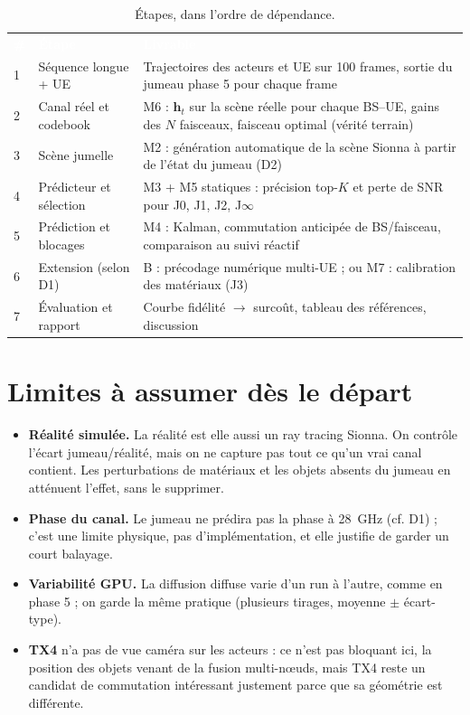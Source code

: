 \documentclass[11pt,a4paper]{article}
\newcommand{\hd}[1]{\textcolor{white}{\textbf{#1}}}
\begin{document}
\begin{table}[H]
\centering
\caption{Étapes, dans l'ordre de dépendance.}
\label{tab:plan}
\begin{tabularx}{\linewidth}{B{0.6cm} P{4.2cm} L}
\hd{\#} & \hd{Étape} & \hd{Livrable} \\
1 & Séquence longue + UE & Trajectoires des acteurs et UE sur 100 frames, sortie du jumeau phase 5 pour chaque frame \\
2 & Canal réel et codebook & M6 : $\mathbf{h}_t$ sur la scène réelle pour chaque BS--UE, gains des $N$ faisceaux, faisceau optimal (vérité terrain) \\
3 & Scène jumelle & M2 : génération automatique de la scène Sionna à partir de l'état du jumeau (D2) \\
4 & Prédicteur et sélection & M3 + M5 statiques : précision top-$K$ et perte de SNR pour J0, J1, J2, J$\infty$ \\
5 & Prédiction et blocages & M4 : Kalman, commutation anticipée de BS/faisceau, comparaison au suivi réactif \\
6 & Extension (selon D1) & B : précodage numérique multi-UE ; ou M7 : calibration des matériaux (J3) \\
7 & Évaluation et rapport & Courbe fidélité $\to$ surcoût, tableau des références, discussion \\
\end{tabularx}
\end{table}

\section{Limites à assumer dès le départ}
\begin{itemize}
  \item \textbf{Réalité simulée.} La \og réalité \fg{} est elle aussi un ray tracing Sionna. On
        contrôle l'écart jumeau/réalité, mais on ne capture pas tout ce qu'un vrai canal
        contient. Les perturbations de matériaux et les objets absents du jumeau en atténuent
        l'effet, sans le supprimer.
  \item \textbf{Phase du canal.} Le jumeau ne prédira pas la phase à 28~GHz (cf. D1) ; c'est
        une limite physique, pas d'implémentation, et elle justifie de garder un court balayage.
  \item \textbf{Variabilité GPU.} La diffusion diffuse varie d'un run à l'autre, comme en phase 5 ;
        on garde la même pratique (plusieurs tirages, moyenne $\pm$ écart-type).
  \item \textbf{TX4} n'a pas de vue caméra sur les acteurs : ce n'est pas bloquant ici, la position
        des objets venant de la fusion multi-n\oe uds, mais TX4 reste un candidat de commutation
        intéressant justement parce que sa géométrie est différente.
\end{itemize}
\end{document}
